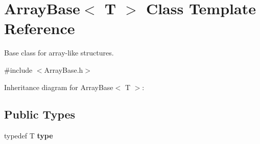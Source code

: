 \hypertarget{classArrayBase}{\section{Array\+Base$<$ T $>$ Class Template Reference}
\label{classArrayBase}
}


Base class for array-\/like structures.  




{\ttfamily \#include $<$Array\+Base.\+h$>$}



Inheritance diagram for Array\+Base$<$ T $>$\+:
\subsection*{Public Types}
\begin{DoxyCompactItemize}
\item 
\hypertarget{classArrayBase_aa881b5ee704e0f293b4dddbaf8990149}{typedef T {\bfseries type}}\label{classArrayBase_aa881b5ee704e0f293b4dddbaf8990149}

\end{DoxyCompactItemize}
